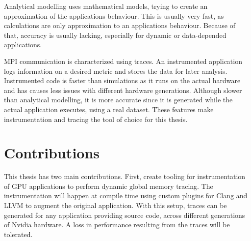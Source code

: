 Analytical modelling uses mathematical models, trying to create an approximation of the applications behaviour.
This is usually very fast, as calculations are only approximation to an applications
behaviour. Because of that, accuracy is usually lacking, especially for dynamic or data-depended applications.

MPI communication is characterized using traces. An  instrumented application  logs information on a desired metric and stores the data for later analysis. Instrumented code is faster than simulations as it runs on the actual hardware and has causes less issues with different 
hardware generations. Although slower than analytical modelling, it is more accurate since it is generated while the actual application executes, using a real dataset.
These features make instrumentation and tracing the tool of choice for this thesis.


%	
\section{Contributions}
This thesis has two main contributions. First, create tooling for instrumentation of GPU applications to perform dynamic global memory tracing. The instrumentation will happen at compile time using custom plugins for Clang and LLVM to augment the original application. With this setup, traces can be generated for any application providing source code,
across different generations of Nvidia hardware. A loss in performance resulting from the traces will be tolerated.

